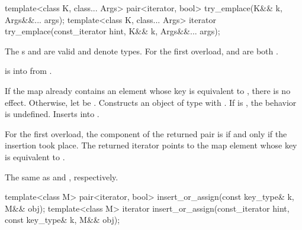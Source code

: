 %
\begin{itemdecl}
template<class K, class... Args>
  pair<iterator, bool> try_emplace(K&& k, Args&&... args);
template<class K, class... Args>
  iterator try_emplace(const_iterator hint, K&& k, Args&&... args);
\end{itemdecl}

\begin{itemdescr}
\pnum
\constraints
The s  and
 are valid and denote types.
For the first overload,
 and
 are both .

\pnum
\expects
{} is 
into  from
.

\pnum
\effects
If the map already contains an element whose key is equivalent to ,
there is no effect.
Otherwise, let  be .
Constructs an object  of type 
with .\newline
If  is ,
the behavior is undefined.
Inserts  into .

\pnum
\returns
For the first overload,
the  component of the returned pair is 
if and only if the insertion took place.
The returned iterator points to the map element
whose key is equivalent to .

\pnum
\complexity
The same as  and , respectively.
\end{itemdescr}

%
\begin{itemdecl}
template<class M>
  pair<iterator, bool> insert_or_assign(const key_type& k, M&& obj);
template<class M>
  iterator insert_or_assign(const_iterator hint, const key_type& k, M&& obj);
\end{itemdecl}

